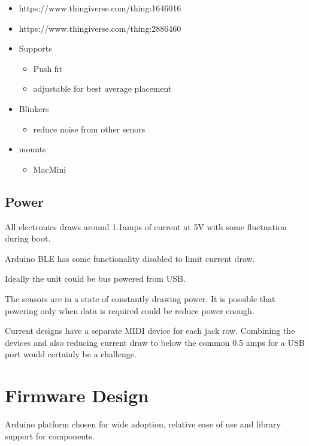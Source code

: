 \begin{itemize}
\item
  https://www.thingiverse.com/thing:1646016
\item
  https://www.thingiverse.com/thing:2886460
\item
  Supports

  \begin{itemize}
  \item
    Push fit
  \item
    adjustable for best average placement
  \end{itemize}
\item
  Blinkers

  \begin{itemize}
  \item
    reduce noise from other senors
  \end{itemize}
\item
  mounts

  \begin{itemize}
  \item
    MacMini
  \end{itemize}
\end{itemize}

\subsection{Power}\label{power}

All electronics draws around 1.1amps of current at 5V with some
fluctuation during boot.

Arduino BLE has some functionality disabled to limit current draw.

Ideally the unit could be bus powered from USB.

The sensors are in a state of constantly drawing power. It is possible
that powering only when data is required could be reduce power enough.

Current designs have a separate MIDI device for each jack row. Combining
the devices and also reducing current draw to below the common 0.5 amps
for a USB port would certainly be a challenge.

\section{Firmware Design}\label{firmware-design}

Arduino platform chosen for wide adoption, relative ease of use and
library support for components.

